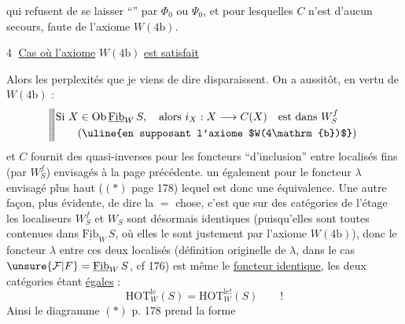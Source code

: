 qui refusent de se laisser ``'' par $\Phi_0$ ou $\Psi_0$, et
pour lesquelles  $C$ n'est d'aucun secours,
faute de l'axiome $W(4\mathrm{b})$.

\textcircled{4} \uline{Cas où l'axiome} $W(4\mathrm{b})$ \uline{est satisfait}

Alors les perplexités que je viens de dire disparaissent. On a aussitôt, en vertu de $W(4\mathrm{b})$ :
\[
\left|\!\left|\!\left|\begin{aligned}
&\text{Si }X\in\mathrm{Ob}\,\underline{\mathrm{Fib}}_W\,S,\quad\text{alors }i_X:X\longrightarrow C(X)\quad\text{est dans }W_S^f\\
&\qquad\text{(\uline{en supposant l'axiome $W(4\mathrm{b})$})}
\end{aligned}\right.\right.\right.
\]
et $C$ fournit des quasi-inverses pour les foncteurs
``d'inclusion'' entre localisés fins (par $W_S^f$) envisagés à la
page précédente.  un également
pour le foncteur $\lambda$ envisagé plus haut ($(*)$ page 178)
lequel est donc une équivalence. Une autre façon,
plus évidente, de dire la $=$ chose, c'est que sur
 des catégories de l'étage les  localiseurs $W_S^f$ et $W_S$
sont désormais identiques (puisqu'elles sont toutes
contenues dans $\underline{\mathrm{Fib}}_W\,S$, où elles le sont justement par
l'axiome $W(4\mathrm{b})$), donc le foncteur $\lambda$ entre
ces deux localisés (définition originelle de $\lambda$,
dans le cas $\unsure{\mathcal{F}|F}=\underline{\mathrm{Fib}}_W\,S$, cf  176) est même
le \uline{foncteur identique}, les deux catégories  étant \uline{égales} :
\[
\mathrm{HOT}_W^{\mathrm{lc}}(S)=\mathrm{HOT}_W^{\mathrm{lc}!}(S)\qquad !
\]
Ainsi le diagramme $(*)$ p. 178 prend la forme
